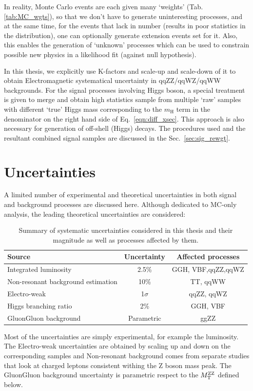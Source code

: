 In reality, Monte Carlo events are each given many `weights' (Tab. \ref{tab:MC_wgts}), so that
we don't have to generate uninteresting processes, and at the same time, for the events that lack
in number (results in poor statistics in the distribution), one can optionally generate
extension events set for it. Also, this enables the generation of `unknown' processes which can
be used to constrain possible new physics in a likelihood fit (against null hypothesis).

In this thesis, we explicitly use K-factors and scale-up and scale-down of it to 
obtain Electromagnetic systematical uncertainty in qqZZ/qqWZ/qqWW backgrounds. For the signal processes involving
Higgs boson, a special treatment is given to merge and obtain high statistics sample from
multiple `raw' samples with different `true' Higgs mass corresponding to the $m_\mathrm{H}$ term
in the denominator on the right hand side of Eq.~\ref{eqn:diff_xsec}.
This approach is also necessary for generation of off-shell (Higgs) decays. The procedures 
used and the resultant combined signal samples are discussed in the Sec.~\ref{sec:sig_rewgt}.

\section{Uncertainties}
A limited number of experimental and theoretical uncertainties in both signal and background
processes are discussed here. Although dedicated to MC-only analysis, the leading theoretical
uncertainties are considered:
\begin{table}[hbt]
    \centering
\begin{tabular}{lcc}
\hline
Source                             & Uncertainty            & Affected processes \\ \hline
Integrated luminosity              & 2.5\%                  & GGH, VBF,qqZZ,qqWZ \\
Non-resonant background estimation & 10\%                   & TT, qqWW           \\
Electro-weak                       & 1$\sigma$ & qqZZ, qqWZ         \\
Higgs branching ratio              & 2\%                    & GGH, VBF           \\
GluonGluon background              & Parametric                   & ggZZ
\end{tabular}
\caption{Summary of systematic uncertainties considered in this thesis and their
magnitude as well as processes affected by them.}
\label{tab:systs}
\end{table}

Most of the uncertainties are simply experimental, for example the luminosity. The Electro-weak
uncertainties are obtained by scaling up and down on the corresponding samples and Non-resonant
background comes from separate studies that look at charged leptons consistent withing the Z boson
mass peak. The GluonGluon background uncertainty is parametric respect to the $M_\mathrm{T}^{\mathrm{ZZ}}$ defined below.
